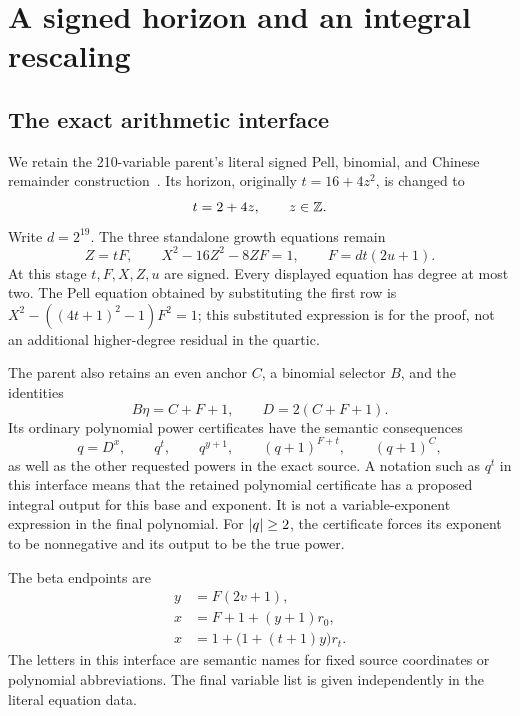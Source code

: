 \section{A signed horizon and an integral rescaling}
\label{sec:signed}

\subsection{The exact arithmetic interface}

We retain the 210-variable parent's literal signed Pell, binomial, and
Chinese remainder construction~\cite{growth210}. Its horizon, originally
\(t=16+4z^2\), is changed to
\begin{equation}\label{eq:horizon}
 t=2+4z,\qquad z\in\mathbb Z.
\end{equation}
Write \(d=2^{19}\). The three standalone growth equations remain
\begin{equation}\label{eq:growthrows}
 Z=tF,\qquad X^2-16Z^2-8ZF=1,\qquad F=dt(2u+1).
\end{equation}
At this stage \(t,F,X,Z,u\) are signed. Every displayed equation has degree
at most two. The Pell equation obtained by substituting the first row is
\(X^2-((4t+1)^2-1)F^2=1\); this substituted expression is for the proof,
not an additional higher-degree residual in the quartic.

The parent also retains an even anchor \(C\), a binomial selector \(B\),
and the identities
\begin{equation}\label{eq:radix}
 B\eta=C+F+1,\qquad D=2(C+F+1).
\end{equation}
Its ordinary polynomial power certificates have the semantic consequences
\begin{equation}\label{eq:power-interface}
 q=D^x,\qquad q^t,\qquad q^{y+1},\qquad
 (q+1)^{F+t},\qquad (q+1)^C,
\end{equation}
as well as the other requested powers in the exact source. A notation
such as \(q^t\) in this interface means that the retained polynomial
certificate has a proposed integral output for this base and exponent.
It is not a variable-exponent expression in the final polynomial.
For \(\lvert q\rvert\ge2\), the certificate forces its exponent to be nonnegative
and its output to be the true power.

The beta endpoints are
\begin{equation}\label{eq:beta-endpoints}
 \begin{aligned}
 y&=F(2v+1),\\
 x&=F+1+(y+1)r_0,\\
 x&=1+\bigl(1+(t+1)y\bigr)r_t.
 \end{aligned}
\end{equation}
The letters in this interface are semantic names for fixed source
coordinates or polynomial abbreviations. The final variable list is
given independently in the literal equation data.

